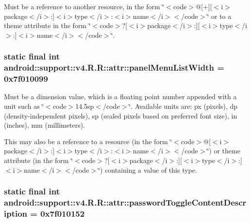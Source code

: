Must be a reference to another resource, in the form \char`\"{}$<$code$>$@\mbox{[}+\mbox{]}\mbox{[}$<$i$>$package$<$/i$>$:\mbox{]}$<$i$>$type$<$/i$>$:$<$i$>$name$<$/i$>$$<$/code$>$\char`\"{} or to a theme attribute in the form \char`\"{}$<$code$>$?\mbox{[}$<$i$>$package$<$/i$>$:\mbox{]}\mbox{[}$<$i$>$type$<$/i$>$:\mbox{]}$<$i$>$name$<$/i$>$$<$/code$>$\char`\"{}. \hypertarget{classandroid_1_1support_1_1v4_1_1_r_1_1attr_7f2e342ff10e109e2f223697c5ed8578}{
\subsubsection[{panelMenuListWidth}]{\setlength{\rightskip}{0pt plus 5cm}static final int android::support::v4.R.R::attr::panelMenuListWidth = 0x7f010099}}
\label{classandroid_1_1support_1_1v4_1_1_r_1_1attr_7f2e342ff10e109e2f223697c5ed8578}


Must be a dimension value, which is a floating point number appended with a unit such as \char`\"{}$<$code$>$14.5sp$<$/code$>$\char`\"{}. Available units are: px (pixels), dp (density-independent pixels), sp (scaled pixels based on preferred font size), in (inches), mm (millimeters). 

This may also be a reference to a resource (in the form \char`\"{}$<$code$>$@\mbox{[}$<$i$>$package$<$/i$>$:\mbox{]}$<$i$>$type$<$/i$>$:$<$i$>$name$<$/i$>$$<$/code$>$\char`\"{}) or theme attribute (in the form \char`\"{}$<$code$>$?\mbox{[}$<$i$>$package$<$/i$>$:\mbox{]}\mbox{[}$<$i$>$type$<$/i$>$:\mbox{]}$<$i$>$name$<$/i$>$$<$/code$>$\char`\"{}) containing a value of this type. \hypertarget{classandroid_1_1support_1_1v4_1_1_r_1_1attr_5f2883607444e24cf76f04c6531158b2}{
\subsubsection[{passwordToggleContentDescription}]{\setlength{\rightskip}{0pt plus 5cm}static final int android::support::v4.R.R::attr::passwordToggleContentDescription = 0x7f010152}}
\label{classandroid_1_1support_1_1v4_1_1_r_1_1attr_5f2883607444e24cf76f04c6531158b2}


